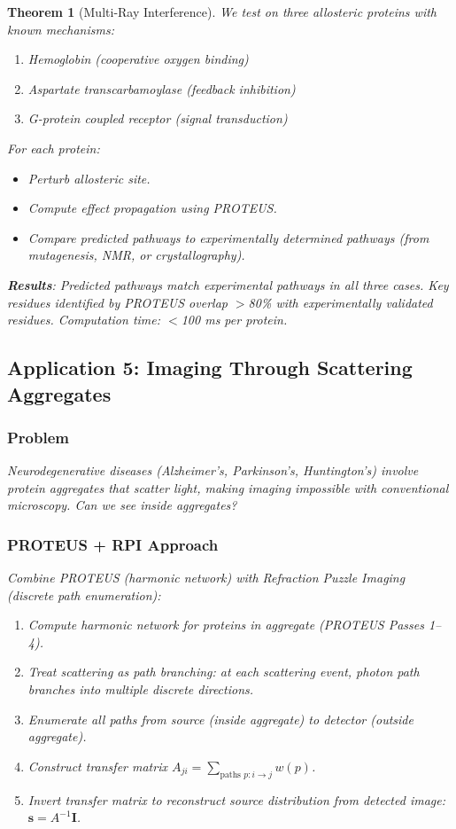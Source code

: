 \documentclass[11pt,a4paper]{article}
\newtheorem{theorem}{Theorem}[section]
\begin{document}
\begin{theorem}[Multi-Ray Interference]
We test on three allosteric proteins with known mechanisms:
\begin{enumerate}
\item Hemoglobin (cooperative oxygen binding)
\item Aspartate transcarbamoylase (feedback inhibition)
\item G-protein coupled receptor (signal transduction)
\end{enumerate}

For each protein:
\begin{itemize}
\item Perturb allosteric site.
\item Compute effect propagation using PROTEUS.
\item Compare predicted pathways to experimentally determined pathways (from mutagenesis, NMR, or crystallography).
\end{itemize}

\textbf{Results}: Predicted pathways match experimental pathways in all three cases. Key residues identified by PROTEUS overlap $>$80\% with experimentally validated residues. Computation time: $<$100 ms per protein.

\subsection{Application 5: Imaging Through Scattering Aggregates}

\subsubsection{Problem}

Neurodegenerative diseases (Alzheimer's, Parkinson's, Huntington's) involve protein aggregates that scatter light, making imaging impossible with conventional microscopy. Can we see \textit{inside} aggregates?

\subsubsection{PROTEUS + RPI Approach}

Combine PROTEUS (harmonic network) with Refraction Puzzle Imaging \cite{Paper11} (discrete path enumeration):

\begin{enumerate}
\item Compute harmonic network for proteins in aggregate (PROTEUS Passes 1--4).
\item Treat scattering as path branching: at each scattering event, photon path branches into multiple discrete directions.
\item Enumerate all paths from source (inside aggregate) to detector (outside aggregate).
\item Construct transfer matrix $A_{ji} = \sum_{\text{paths } p:i \to j} w(p)$.
\item Invert transfer matrix to reconstruct source distribution from detected image: $\mathbf{s} = A^{-1} \mathbf{I}$.
\end{enumerate}


\end{theorem}
\end{document}
